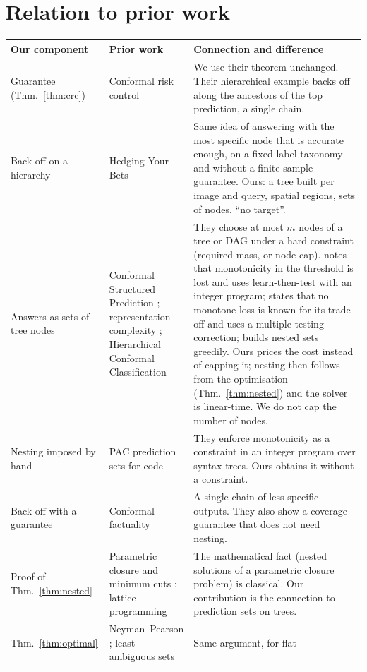 \documentclass[11pt,a4paper]{article}
\theoremstyle{definition}
\theoremstyle{remark}
\begin{document}
\section{Relation to prior work}
\label{sec:prior}
\begin{center}
\small
\begin{tabular}{L{3.0cm}L{5.5cm}L{6.3cm}}
\toprule
Our component & Prior work & Connection and difference \\
\midrule
Guarantee (Thm.~\ref{thm:crc}) & Conformal risk control \cite{crc} & We use their theorem unchanged. Their
hierarchical example backs off along the ancestors of the top prediction, a single chain. \\
Back-off on a hierarchy & Hedging Your Bets \cite{hedging} & Same idea of answering with the most specific node that
is accurate enough, on a fixed label taxonomy and without a finite-sample guarantee. Ours: a tree built per image
and query, spatial regions, sets of nodes, ``no target''. \\
Answers as sets of tree nodes & Conformal Structured Prediction \cite{csp}; representation complexity
\cite{mortier22,mortier26}; Hierarchical Conformal Classification \cite{hcc} & They choose at most $m$ nodes of a
tree or DAG under a hard constraint (required mass, or node cap). \cite{csp} notes that monotonicity in the
threshold is lost and uses learn-then-test with an integer program; \cite{hcc} states that no monotone loss is
known for its trade-off and uses a multiple-testing correction; \cite{mortier26} builds nested sets greedily. Ours
prices the cost instead of capping it; nesting then follows from the optimisation (Thm.~\ref{thm:nested}) and the
solver is linear-time. We do not cap the number of nodes. \\
Nesting imposed by hand & PAC prediction sets for code \cite{khakhar} & They enforce monotonicity as a constraint in
an integer program over syntax trees. Ours obtains it without a constraint. \\
Back-off with a guarantee & Conformal factuality \cite{mohri} & A single chain of less specific outputs. They also
show a coverage guarantee that does not need nesting. \\
Proof of Thm.~\ref{thm:nested} & Parametric closure and minimum cuts \cite{picard,ggt}; lattice programming
\cite{topkis} & The mathematical fact (nested solutions of a parametric closure problem) is classical. Our
contribution is the connection to prediction sets on trees. \\
Thm.~\ref{thm:optimal} & Neyman--Pearson \cite{np}; least ambiguous sets \cite{sadinle} & Same argument, for flat

\end{tabular}
\end{center}
\end{document}
